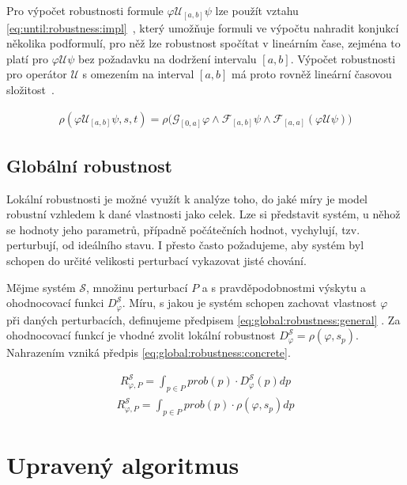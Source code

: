 Pro výpočet robustnosti formule $\varphi\mathcal{U}_{[a,b]}\psi$ lze použít vztahu \ref{eq:until:robustness:impl}~\cite{donze2010},
který umožňuje formuli ve výpočtu nahradit konjukcí několika podformulí, pro něž lze robustnost spočítat v lineárním čase, zejména 
to platí pro $\varphi\mathcal{U}\psi$ bez požadavku na dodržení intervalu $[a,b]$. Výpočet robustnosti pro operátor $\mathcal{U}$
s omezením na interval $[a,b]$ má proto rovněž lineární časovou složitost~\cite{donze2010}.

\begin{align}\label{eq:until:robustness:impl}
\rho(\varphi\mathcal{U}_{[a,b]}\psi, s, t) = \rho\Big(\mathcal{G}_{[0, a]}\varphi \wedge \mathcal{F}_{[a,b]}\psi \wedge \mathcal{F}_{[a,a]}(\varphi\mathcal{U}\psi)\Big)
\end{align}

\subsection{Globální robustnost}

Lokální robustnosti je možné využít k analýze toho, do jaké míry je model robustní vzhledem
k dané vlastnosti jako celek. Lze si představit systém, u něhož se hodnoty jeho parametrů, případně počátečních
hodnot, vychylují, tzv. perturbují, od ideálního stavu. I přesto často požadujeme, aby systém byl schopen do určité velikosti
perturbací vykazovat jisté chování.

Mějme systém $\mathcal{S}$, množinu perturbací $P$ a s pravděpodobnostmi výskytu a ohodnocovací funkci $D_\varphi^\mathcal{S}$.
Míru, s jakou je systém schopen zachovat vlastnost $\varphi$ při daných perturbacích,
definujeme předpisem \ref{eq:global:robustness:general} \cite{kitano2007}. Za ohodnocovací funkcí je vhodné zvolit lokální
robustnost $D_\varphi^\mathcal{S} = \rho(\varphi, s_p)$. Nahrazením vzniká předpis \ref{eq:global:robustness:concrete}.

\begin{align}
R_{\varphi, P}^\mathcal{S} = {\displaystyle\int_{p \in P}}prob(p) \cdot D_\varphi^\mathcal{S}(p)dp\label{eq:global:robustness:general}
\end{align}
\begin{align}
R_{\varphi, P}^\mathcal{S} = {\displaystyle\int_{p \in P}}prob(p) \cdot \rho(\varphi, s_p)dp\label{eq:global:robustness:concrete}
\end{align}

\section{Upravený algoritmus}\label{section:algorithm:updated}

